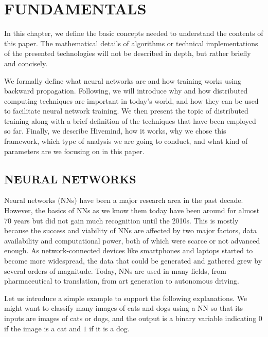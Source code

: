 \chapter{FUNDAMENTALS}\label{chapter:fundamentals}

In this chapter, we define the basic concepts needed to understand the contents of this paper.
The mathematical details of algorithms or technical implementations of the presented technologies will not be described in depth, but rather briefly and concisely.

We formally define what neural networks are and how training works using backward propagation.
Following, we will introduce why and how distributed computing techniques are important in today's world, and how they can be used to facilitate neural network training.
We then present the topic of distributed training along with a brief definition of the techniques that have been employed so far.
Finally, we describe Hivemind, how it works, why we chose this framework, which type of analysis we are going to conduct, and what kind of parameters are we focusing on in this paper.

\section{NEURAL NETWORKS}
Neural networks (NNs) have been a major research area in the past decade.
However, the basics of NNs as we know them today have been around for almost 70 years but did not gain much recognition until the 2010s.
This is mostly because the success and viability of NNs are affected by two major factors, data availability and computational power, both of which were scarce or not advanced enough.
As network-connected devices like smartphones and laptops started to become more widespread, the data that could be generated and gathered grew by several orders of magnitude.
Today, NNs are used in many fields, from pharmaceutical to translation, from art generation to autonomous driving.

Let us introduce a simple example to support the following explanations.
We might want to classify many images of cats and dogs using a NN so that its inputs are images of cats or dogs, and the output is a binary variable indicating $0$ if the image is a cat and $1$ if it is a dog.


